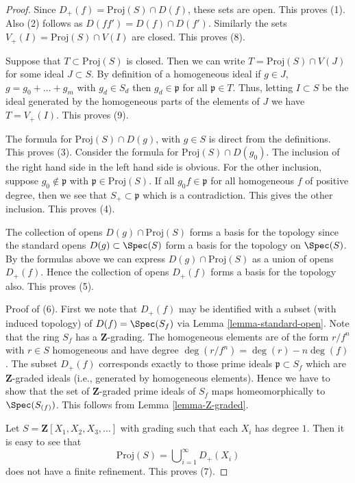 \begin{proof}
Since $D_{+}(f) = \text{Proj}(S) \cap D(f)$, these sets are open.
This proves (1). Also (2) follows as $D(ff') = D(f) \cap D(f')$.
Similarly the sets $V_{+}(I) = \text{Proj}(S) \cap V(I)$
are closed. This proves (8).

\medskip\noindent
Suppose that $T \subset \text{Proj}(S)$ is closed.
Then we can write $T = \text{Proj}(S) \cap V(J)$ for some
ideal $J \subset S$. By definition of a homogeneous ideal
if $g \in J$, $g = g_0 + \ldots + g_m$
with $g_d \in S_d$ then $g_d \in \mathfrak p$ for all
$\mathfrak p \in T$. Thus, letting $I \subset S$
be the ideal generated by the homogeneous parts of the elements
of $J$ we have $T = V_{+}(I)$. This proves (9).

\medskip\noindent
The formula for $\text{Proj}(S) \cap D(g)$, with $g \in S$ is direct
from the definitions. This proves (3).
Consider the formula for $\text{Proj}(S) \cap D(g_0)$.
The inclusion of the right hand side in the left hand side is
obvious. For the other inclusion, suppose $g_0 \not \in \mathfrak p$
with $\mathfrak p \in \text{Proj}(S)$. If all $g_0f \in \mathfrak p$
for all homogeneous $f$ of positive degree, then we see that
$S_{+} \subset \mathfrak p$ which is a contradiction. This gives
the other inclusion. This proves (4).

\medskip\noindent
The collection of opens $D(g) \cap \text{Proj}(S)$
forms a basis for the topology since the standard opens
$D(g) \subset \Spec(S)$ form a basis for the topology on
$\Spec(S)$. By the formulas above we can express
$D(g) \cap \text{Proj}(S)$ as a union of opens $D_{+}(f)$.
Hence the collection of opens $D_{+}(f)$ forms a basis for the topology
also. This proves (5).

\medskip\noindent
Proof of (6). First we note that $D_{+}(f)$ may be identified
with a subset (with induced topology) of $D(f) = \Spec(S_f)$
via Lemma \ref{lemma-standard-open}. Note that the ring
$S_f$ has a $\mathbf{Z}$-grading. The homogeneous elements are
of the form $r/f^n$ with $r \in S$ homogeneous and have
degree $\deg(r/f^n) = \deg(r) - n\deg(f)$. The subset
$D_{+}(f)$ corresponds exactly to those prime ideals
$\mathfrak p \subset S_f$ which are $\mathbf{Z}$-graded ideals
(i.e., generated by homogeneous elements). Hence we have to show that
the set of $\mathbf{Z}$-graded prime ideals of $S_f$ maps homeomorphically
to $\Spec(S_{(f)})$. This follows from Lemma \ref{lemma-Z-graded}.

\medskip\noindent
Let $S = \mathbf{Z}[X_1, X_2, X_3, \ldots]$ with grading such that
each $X_i$ has degree $1$. Then it is easy to see that
$$
\text{Proj}(S) = \bigcup\nolimits_{i = 1}^\infty D_{+}(X_i)
$$
does not have a finite refinement. This proves (7).


\end{proof}
